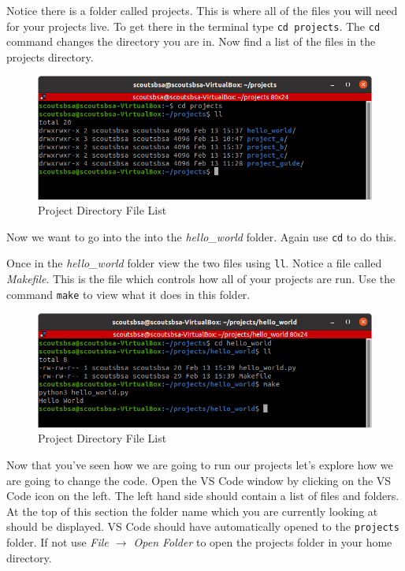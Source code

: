     \FloatBarrier

    Notice there is a folder called projects.
    This is where all of the files you will need for your projects live.
    To get there in the terminal type \texttt{cd projects}.
    The \texttt{cd} command changes the directory you are in.
    Now find a list of the files in the projects directory.

    \begin{figure}[ht]
      \centering
      \includegraphics[width=0.8\linewidth]{./images/projects_file_list.png}
      \caption{Project Directory File List}
      \label{fig:proj_file_list}
    \end{figure}

    \FloatBarrier

    Now we want to go into the into the \textit{hello\_world} folder.
    Again use \texttt{cd} to do this.

    Once in the \textit{hello\_world} folder view the two files using \texttt{ll}.
    Notice a file called \textit{Makefile}.
    This is the file which controls how all of your projects are run.
    Use the command \texttt{make} to view what it does in this folder.

    \begin{figure}[ht]
      \centering
      \includegraphics[width=0.8\linewidth]{./images/hello_world.png}
      \caption{Project Directory File List}
      \label{fig:hello_world_example}
    \end{figure}

    \FloatBarrier

    Now that you've seen how we are going to run our projects let's explore how we are going
      to change the code.
    Open the VS Code window by clicking on the VS Code icon on the left.
    The left hand side should contain a list of files and folders.
    At the top of this section the folder name which you are currently looking at 
      should be displayed.
    VS Code should have automatically opened to the \texttt{projects} folder.
    If not use \textit{File $\rightarrow$ Open Folder} to open the projects folder in your home directory.

